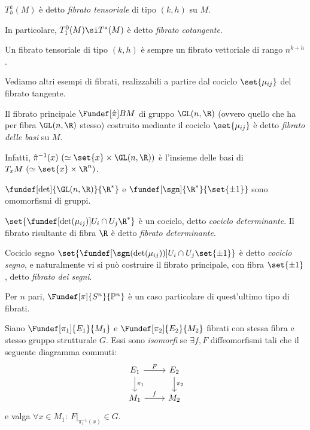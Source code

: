 \begin{defn}
	$T_h^k(M)$ è detto \emph{fibrato tensoriale} di tipo $(k, h)$ su $M$.
	
	In particolare, $T_1^0(M) \si T \dual (M)$ è detto \emph{fibrato cotangente}.
\end{defn}

\begin{oss}
	Un fibrato tensoriale di tipo $(k, h)$ è sempre un fibrato vettoriale di rango $n^{k+h}$.
\end{oss}

Vediamo altri esempi di fibrati, realizzabili a partire dal cociclo $\set{\mu_{ij}}$ del fibrato tangente.

\begin{defn}
	Il fibrato principale $\Fundef[\hat{\pi}]{B}{M}$ di gruppo $\GL(n, \R)$ (ovvero quello che ha per fibra $\GL(n, \R)$ stesso) costruito mediante il cociclo $\set{\mu_{ij}}$ è detto \emph{fibrato delle basi} su $M$.
	
	Infatti, $\hat{\pi}^{-1}(x)  \ (\simeq \set{x} \times \GL(n, \R) )$ è l'insieme delle basi di $T_x M \ (\simeq \set{x} \times \R^n)$.
\end{defn}

\begin{oss} 
	$ \fundef[\det]{\GL(n, \R)}{\R^*} $ e $\fundef[\sgn]{\R^*}{\set{\pm 1}}$ sono omomorfismi di gruppi.
\end{oss}

\begin{defn}
	$ \set{  \fundef[\det(\mu_{ij})]{U_i \cap U_j}{\R^*} } $ è un cociclo, detto \emph{cociclo determinante}. Il fibrato risultante di fibra $\R$ è detto \emph{fibrato determinante}.
\end{defn}

\begin{defn}{Cociclo segno}
	$ \set{  \fundef[\sgn(\det(\mu_{ij}))]{U_i \cap U_j}{\set{\pm 1}} } $ è detto \emph{cociclo segno}, e naturalmente vi si può costruire il fibrato principale, con fibra $\set{\pm 1}$, detto \emph{fibrato dei segni}.
\end{defn}
\begin{oss}
	Per $n$ pari, $\Fundef[\pi]{S^n}{\Ps^n}$ è un caso particolare di quest'ultimo tipo di fibrati.
\end{oss}

Siano $\Fundef[\pi_1]{E_1}{M_1}$ e $\Fundef[\pi_2]{E_2}{M_2}$ fibrati con stessa fibra e stesso gruppo strutturale $G$. Essi sono \emph{isomorfi} se $\exists f, F$ diffeomorfismi tali che il seguente diagramma commuti: \[
\begin{tikzcd}
	E_1 \arrow[r, "F"] \arrow[d, "\pi_1"] & E_2 \arrow[d, "\pi_2"] \\
	M_1 \arrow[r, "f"]  & M_2
\end{tikzcd} \]
e valga $\forall x \in M_1: \ F|_{\pi_1^{-1}(x)} \in G$.

